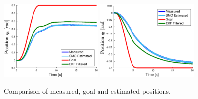 \documentclass[a4paper, 10pt]{article}
\begin{document}
\begin{figure}
  \includegraphics[width=0.45\textwidth]{Figures/result_q6.eps}
  \includegraphics[width=0.45\textwidth]{Figures/result_q7.eps}
  \caption{Comparison of measured, goal and estimated positions.}
  \label{fig:result_q}
\end{figure}
\end{document}
